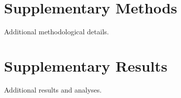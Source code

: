 \section{Supplementary Methods}
\label{sec:supp_methods}

Additional methodological details.

\section{Supplementary Results}
\label{sec:supp_results}

Additional results and analyses.


